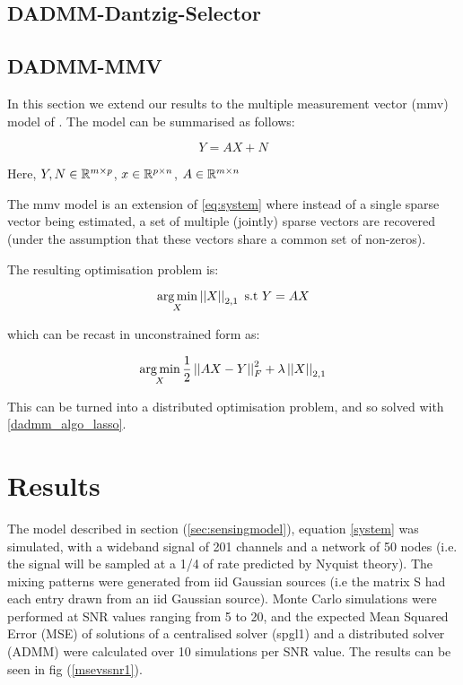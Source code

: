 \subsection{DADMM-Dantzig-Selector}

\subsection{DADMM-MMV}
In this section we extend our results to the multiple measurement vector (\gls{mmv}) model of \cite{cotter2005sparse}. The model can be summarised as follows:

\begin{equation}
Y = AX + N
\end{equation}

Here, \(Y, N\in {\mathbb{R}}^{m\times p}\), \(x \in {\mathbb{R}}^{p\times n}\), \(A\in {\mathbb{R}}^{m \times n}\)

The \gls{mmv} model is an extension of \eqref{eq:system} where instead of a single sparse vector being estimated, a set of multiple (jointly) sparse vectors are recovered (under the assumption that these vectors share a common set of non-zeros).

The resulting optimisation problem is:

\begin{equation}
\operatorname*{arg\,min}_X \left|\left|X\right|\right|_{2,1} \text{ s.t } Y=AX
\label{program:bpmmv}
\end{equation}

which can be recast in unconstrained form as:

\begin{equation}
\operatorname*{arg\,min}_X \frac{1}{2}\left|\left|AX-Y\right|\right|_F^2 + \lambda\left|\left|X\right|\right|_{2,1}
\label{program:lassommv}
\end{equation}

This can be turned into a distributed optimisation problem, and so solved with \eqref{dadmm_algo_lasso}.

\section{Results} \label{sec:results}

The model described in section (\ref{sec:sensingmodel}), equation \eqref{system} was simulated, with a wideband signal of 201 channels and a network of 50 nodes (i.e. the signal will be sampled at a 1/4 of rate predicted by Nyquist theory). The mixing patterns were generated from iid Gaussian sources (i.e the matrix S had each entry drawn from an iid Gaussian source). Monte Carlo simulations were performed at SNR values ranging from 5 to 20, and the expected Mean Squared Error (MSE) of solutions of a centralised solver (spgl1) and a distributed solver (ADMM) were calculated over 10 simulations per SNR value. The results can be seen in fig (\ref{msevssnr1}). 

